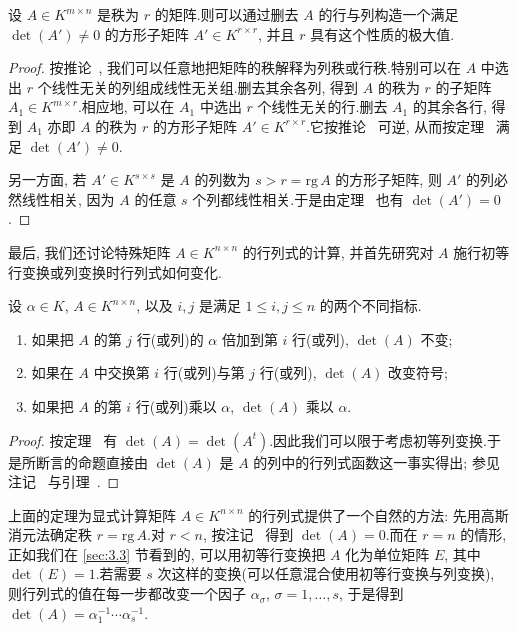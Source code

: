 \begin{corollary}\label{cor:4.3.5}
设 $A \in K^{m \times n}$ 是秩为 $r$ 的矩阵.则可以通过删去 $A$ 的行与列构造一个满足 $\det(A') \neq 0$ 的方形子矩阵 $A' \in K^{r \times r}$, 并且 $r$ 具有这个性质的极大值.
\end{corollary}

\begin{proof}
按推论~, 我们可以任意地把矩阵的秩解释为列秩或行秩.特别可以在 $A$ 中选出 $r$ 个线性无关的列组成线性无关组.删去其余各列, 得到 $A$ 的秩为 $r$ 的子矩阵 $A_1 \in K^{m \times r}$.相应地, 可以在 $A_1$ 中选出 $r$ 个线性无关的行.删去 $A_1$ 的其余各行, 得到 $A_1$ 亦即 $A$ 的秩为 $r$ 的方形子矩阵 $A' \in K^{r \times r}$.它按推论~ 可逆, 从而按定理~ 满足 $\det(A') \neq 0$.

另一方面, 若 $A' \in K^{s \times s}$ 是 $A$ 的列数为 $s > r = \mathrm{rg}\, A$ 的方形子矩阵, 则 $A'$ 的列必然线性相关, 因为 $A$ 的任意 $s$ 个列都线性相关.于是由定理~ 也有 $\det(A') = 0$.
\end{proof}

最后, 我们还讨论特殊矩阵 $A \in K^{n \times n}$ 的行列式的计算, 并首先研究对 $A$ 施行初等行变换或列变换时行列式如何变化.

\begin{theorem}\label{thm:4.3.6}
设 $\alpha \in K$, $A \in K^{n \times n}$, 以及 $i, j$ 是满足 $1 \leq i, j \leq n$ 的两个不同指标.
\begin{enumerate}
\item[(i)] 如果把 $A$ 的第 $j$ 行(或列)的 $\alpha$ 倍加到第 $i$ 行(或列), $\det(A)$ 不变;
\item[(ii)] 如果在 $A$ 中交换第 $i$ 行(或列)与第 $j$ 行(或列), $\det(A)$ 改变符号;
\item[(iii)] 如果把 $A$ 的第 $i$ 行(或列)乘以 $\alpha$, $\det(A)$ 乘以 $\alpha$.
\end{enumerate}
\end{theorem}

\begin{proof}
按定理~ 有 $\det(A) = \det(A^t)$.因此我们可以限于考虑初等列变换.于是所断言的命题直接由 $\det(A)$ 是 $A$ 的列中的行列式函数这一事实得出; 参见注记~ 与引理~.
\end{proof}

上面的定理为显式计算矩阵 $A \in K^{n \times n}$ 的行列式提供了一个自然的方法: 先用高斯消元法确定秩 $r = \mathrm{rg}\, A$.对 $r < n$, 按注记~ 得到 $\det(A) = 0$.而在 $r = n$ 的情形, 正如我们在 \ref{sec:3.3} 节看到的, 可以用初等行变换把 $A$ 化为单位矩阵 $E$, 其中 $\det(E) = 1$.若需要 $s$ 次这样的变换(可以任意混合使用初等行变换与列变换), 则行列式的值在每一步都改变一个因子 $\alpha_{\sigma}$, $\sigma = 1, \ldots, s$, 于是得到 $\det(A) = \alpha_1^{-1} \cdots \alpha_s^{-1}$.

